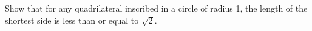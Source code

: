 Show that for any quadrilateral inscribed in a circle of radius 1, the length of the shortest side is less than or equal to $\sqrt{2}$.